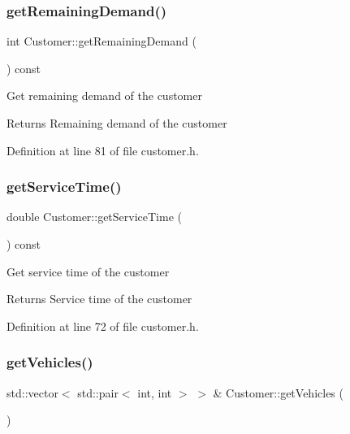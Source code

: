 \mbox{\label{class_customer_ab7ab4f52f6fd1ced79b7cecdde4675ec}} 
\subsubsection{\texorpdfstring{get\+Remaining\+Demand()}{getRemainingDemand()}}
{\footnotesize\ttfamily int Customer\+::get\+Remaining\+Demand (\begin{DoxyParamCaption}{ }\end{DoxyParamCaption}) const\hspace{0.3cm}{\ttfamily [inline]}}

Get remaining demand of the customer \begin{DoxyReturn}{Returns}
Remaining demand of the customer 
\end{DoxyReturn}


Definition at line 81 of file customer.\+h.

\mbox{\label{class_customer_aa9c2a49942a8c7de055ee902e5e72127}} 
\subsubsection{\texorpdfstring{get\+Service\+Time()}{getServiceTime()}}
{\footnotesize\ttfamily double Customer\+::get\+Service\+Time (\begin{DoxyParamCaption}{ }\end{DoxyParamCaption}) const\hspace{0.3cm}{\ttfamily [inline]}}

Get service time of the customer \begin{DoxyReturn}{Returns}
Service time of the customer 
\end{DoxyReturn}


Definition at line 72 of file customer.\+h.

\mbox{\label{class_customer_ad01e6465075cfdb95bd42999d5330bdf}} 
\subsubsection{\texorpdfstring{get\+Vehicles()}{getVehicles()}}
{\footnotesize\ttfamily std\+::vector$<$ std\+::pair$<$ int, int $>$ $>$ \& Customer\+::get\+Vehicles (\begin{DoxyParamCaption}{ }\end{DoxyParamCaption})\hspace{0.3cm}{\ttfamily [inline]}}

